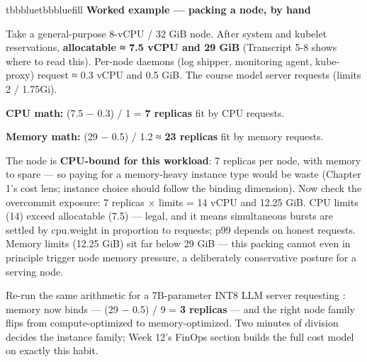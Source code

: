\begin{calloutbox}{tbbblue}{tbbbluefill}
{\normalsize\bfseries\color{tbbblue}Worked example — packing a node, by hand}\par\vspace{3pt}
Take a general-purpose 8-vCPU / 32 GiB node. After system and kubelet reservations, \textbf{allocatable ≈ 7.5 vCPU and 29 GiB} (Transcript 5-8 shows where to read this). Per-node daemons (log shipper, monitoring agent, kube-proxy) request ≈ 0.3 vCPU and 0.5 GiB. The course model server requests  (limits 2 / 1.75Gi).

\begin{tbbitemize}
  \item \textbf{CPU math:} (7.5 − 0.3) / 1 = \textbf{7 replicas} fit by CPU requests.
  \item \textbf{Memory math:} (29 − 0.5) / 1.2 ≈ \textbf{23 replicas} fit by memory requests.
\end{tbbitemize}

The node is \textbf{CPU-bound for this workload}: 7 replicas per node, with memory to spare — so paying for a memory-heavy instance type would be waste (Chapter 1's cost lens; instance choice should follow the binding dimension). Now check the overcommit exposure: 7 replicas × limits = 14 vCPU and 12.25 GiB. CPU limits (14) exceed allocatable (7.5) — legal, and it means simultaneous bursts are settled by cpu.weight in proportion to requests; p99 depends on honest requests. Memory limits (12.25 GiB) sit far below 29 GiB — this packing cannot even in principle trigger node memory pressure, a deliberately conservative posture for a serving node.

Re-run the same arithmetic for a 7B-parameter INT8 LLM server requesting : memory now binds — (29 − 0.5) / 9 = \textbf{3 replicas} — and the right node family flips from compute-optimized to memory-optimized. Two minutes of division decides the instance family; Week 12's FinOps section builds the full cost model on exactly this habit.
\end{calloutbox}

\vspace{3.0pt}

